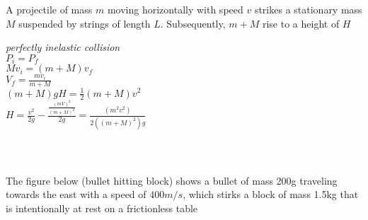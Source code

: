 \documentclass{article}
\begin{document}
A projectile of mass $m$ moving horizontally with speed $v$ strikes a stationary mass $M$ suspended by strings of length $L$. Subsequently, $m+M$ rise to a height of $H$

\textit{perfectly inelastic collision}\\[20pt]

$P_i = P_f $\\[15pt]

$Mv_i = (m+M)v_f$\\[15pt]

$V_f = \frac{mv_i}{m+M}$\\[15pt]

$(m+M)gH = \frac{1}{2}(m+M)v^2$\\[15pt]

$H= \frac{v^2}{2g} - \frac{\frac{(mV)^2}{(m+M)^2}}{2g} = \frac{(m^2v^2)}{2((m+M)^2)g}$\\[15pt]

\hrulefill\\[15pt]


\pagebreak
\hrulefill
\subsubsection{}
\hrulefill \\[15pt]

The figure below (bullet hitting block) shows a bullet of mass 200g traveling towards the east with a speed of $400m/s$, which stirks a block of  mass 1.5kg that is intentionally at rest on a frictionless table \\[15pt]

\end{document}
